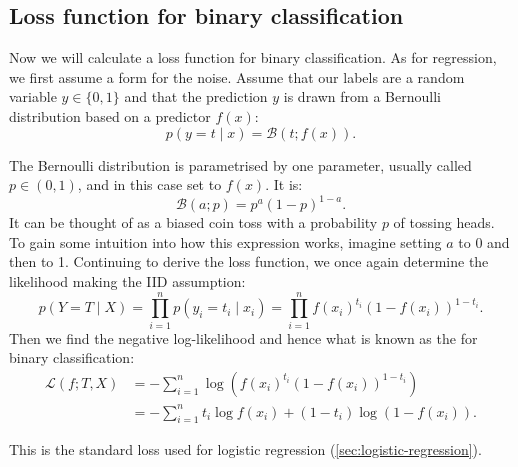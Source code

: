         \subsection{Loss function for binary classification}
        \label{sec:loss-classification}

            Now we will calculate a loss function for binary classification. As for regression, we first assume a form for the noise. Assume that our labels are a random variable $y \in \{0, 1\}$ and that the prediction $y$ is drawn from a Bernoulli distribution based on a predictor $f(x)$:
            \begin{equation}
                p(y = t \mid x) = \mathcal B(t; f(x)).
            \end{equation}

            The Bernoulli distribution is parametrised by one parameter, usually called $p \in (0, 1)$, and in this case set to $f(x)$. It is:
            \begin{equation}
                \mathcal B(a; p) = p^a(1 - p)^{1 - a}.
            \end{equation}
            It can be thought of as a biased coin toss with a probability $p$ of tossing heads. To gain some intuition into how this expression works, imagine setting $a$ to 0 and then to 1. Continuing to derive the loss function, we once again determine the likelihood making the IID assumption:
            \begin{equation}
                p(Y = T \mid X) = \prod_{i = 1}^n p(y_i = t_i \mid x_i) = \prod_{i = 1}^n f(x_i)^{t_i}(1 - f(x_i))^{1 - {t_i}}.
            \end{equation}
            Then we find the negative log-likelihood and hence what is known as the  for binary classification:
            \begin{align}
                \mathcal L(f; T, X) &= -\sum_{i = 1}^n \log \left(f(x_i)^{t_i}(1 - f(x_i))^{1 - {t_i}}\right)\\
                    &= -\sum_{i = 1}^n t_i \log f(x_i) + (1 - t_i) \log (1 - f(x_i)).
            \end{align}

            This is the standard loss used for logistic regression (\autoref{sec:logistic-regression}).


